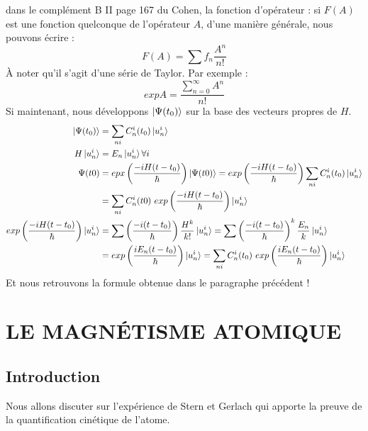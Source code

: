 \documentclass[12pt,a4paper,titlepage]{book}
\begin{document}
dans le complément B II page 167 du Cohen, la fonction d'opérateur : si $F(A)$ est une fonction quelconque de l'opérateur $A$, d'une manière générale, nous pouvons écrire :
\begin{equation*}
F(A) = \sum f_n \frac{A^n}{n !}
\end{equation*}
À noter qu'il s'agit d'une série de Taylor. Par exemple :
\begin{equation*}
exp A = \frac{\sum\limits_{n=0}^\infty A^n}{n !}
\end{equation*}
Si maintenant, nous développons $\ket{\Psi (t_0)}$ sur la base des vecteurs propres de $H$.
\begin{align*}
\ket{\Psi (t_0)} &= \sum\limits_{n i} C_n^i (t_0) \ket{u_n^i}\\
H \ket{u_n^i} &= E_n \ket{u_n^i} \forall i\\
\Psi (t0) &= epx \left( \frac{-i H(t-t_0)}{\hbar} \right) \ket{\Psi (t0)} = exp \left( \frac{-i H (t-t_0)}{\hbar} \right) \sum\limits_{n i} C_n^i (t_0) \ket{u_n^i}\\
&= \sum\limits_{n i} C_n^i (t0) ~exp \left( \frac{-i H (t-t_0)}{\hbar} \right) \ket{u_n^i}\\
exp \left( \frac{-i H (t-t_0)}{\hbar} \right) \ket{u_n^i} &= \sum \left( \frac{-i (t-t_0)}{\hbar} \right) \frac{H^k}{k !} \ket{u_n^i} = \sum \left( \frac{-i (t-t_0)}{\hbar} \right)^k \frac{E_n}{k}\ket{u_n^i}\\
&= exp \left( \frac{i E_n (t-t_0)}{\hbar} \right) \ket{u_n^i} = \sum\limits_{n i} C_n^i (t_0) ~exp \left( \frac{i E_n (t-t_0)}{\hbar} \right) \ket{u_n^i}
\end{align*}
Et nous retrouvons la formule obtenue dans le paragraphe précédent !

\chapter{LE MAGNÉTISME ATOMIQUE}
\section{Introduction}
Nous allons discuter sur l'expérience de Stern et Gerlach qui apporte la preuve de la quantification cinétique de l'atome.\\
\end{document}
